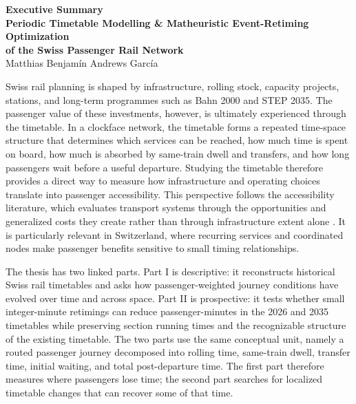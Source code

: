 \documentclass[10pt,a4paper]{article}
\begin{document}
\begin{center}
{\Large\bfseries Executive Summary}\\[0.45em]
{\large\bfseries  Periodic Timetable Modelling \& 
Matheuristic Event-Retiming Optimization\\[0.3em]
of the Swiss Passenger Rail Network}\\[0.45em]
Matthias Benjam\'in Andrews Garc\'ia
\end{center}

Swiss rail planning is shaped by infrastructure, rolling stock, capacity projects, stations, and long-term programmes such as Bahn 2000 and STEP 2035. The passenger value of these investments, however, is ultimately experienced through the timetable. In a clockface network, the timetable forms a repeated time-space structure that determines which services can be reached, how much time is spent on board, how much is absorbed by same-train dwell and transfers, and how long passengers wait before a useful departure. Studying the timetable therefore provides a direct way to measure how infrastructure and operating choices translate into passenger accessibility. This perspective follows the accessibility literature, which evaluates transport systems through the opportunities and generalized costs they create rather than through infrastructure extent alone \citep{hansen1959accessibility,geurs2004accessibility}. It is particularly relevant in Switzerland, where recurring services and coordinated nodes make passenger benefits sensitive to small timing relationships.

The thesis has two linked parts. Part I is descriptive: it reconstructs historical Swiss rail timetables and asks how passenger-weighted journey conditions have evolved over time and across space. Part II is prospective: it tests whether small integer-minute retimings can reduce passenger-minutes in the 2026 and 2035 timetables while preserving section running times and the recognizable structure of the existing timetable. The two parts use the same conceptual unit, namely a routed passenger journey decomposed into rolling time, same-train dwell, transfer time, initial waiting, and total post-departure time. The first part therefore measures where passengers lose time; the second part searches for localized timetable changes that can recover some of that time.
\end{document}
